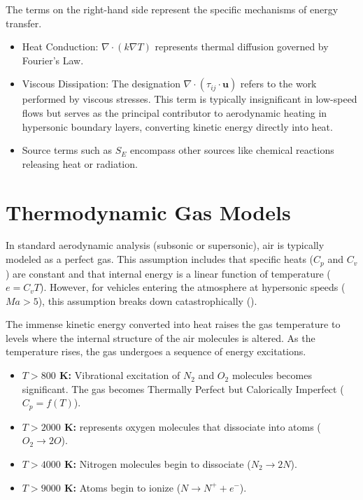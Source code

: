 The terms on the right-hand side represent the specific mechanisms of energy transfer.
\begin{itemize}
    \item Heat Conduction: $\nabla \cdot (k \nabla T)$ represents thermal diffusion governed by Fourier's Law.

    \item Viscous Dissipation: The designation $\nabla \cdot (\tau_{ij} \cdot \mathbf{u})$ refers to the work performed by viscous stresses. This term is typically insignificant in low-speed flows but serves as the principal contributor to aerodynamic heating in hypersonic boundary layers, converting kinetic energy directly into heat.

    \item Source terms such as $S_E$ encompass other sources like chemical reactions releasing heat or radiation.
\end{itemize}

\section{Thermodynamic Gas Models}

\par
In standard aerodynamic analysis (subsonic or supersonic), air is typically modeled as a perfect gas. This assumption includes that specific heats ($C_p$ and $C_v$) are constant and that internal energy is a linear function of temperature ($e = C_v T$). However, for vehicles entering the atmosphere at hypersonic speeds ($Ma > 5$), this assumption breaks down catastrophically (\cite{AndersonHypersonic}).
\par
The immense kinetic energy converted into heat raises the gas temperature to levels where the internal structure of the air molecules is altered. As the temperature rises, the gas undergoes a sequence of energy excitations.
\begin{itemize}
    \item \textbf{$T > 800$ K:} Vibrational excitation of $N_2$ and $O_2$ molecules becomes significant. The gas becomes Thermally Perfect but Calorically Imperfect ($C_p = f(T)$).

    \item \textbf{$T > 2000$ K:} represents oxygen molecules that dissociate into atoms ($O_2 \rightarrow 2O$).

    \item \textbf{$T > 4000$ K:} Nitrogen molecules begin to dissociate ($N_2 \rightarrow 2N$).

    \item \textbf{$T > 9000$ K:} Atoms begin to ionize ($N \rightarrow N^+ + e^-$).
\end{itemize}

